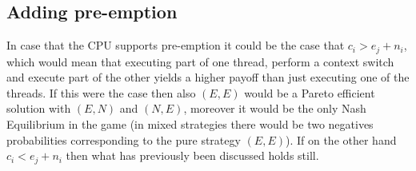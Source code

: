 \subsection{Adding pre-emption}

In case that the CPU supports pre-emption it could be the case that
$c_i > e_j + n_i$, which would mean that executing part of one thread, perform
a context switch and execute part of the other yields a higher payoff than
just executing one of the threads. If this were the case then also $(E, E)$
would be a Pareto efficient solution with $(E, N)$ and $(N, E)$, moreover it
would be the only Nash Equilibrium in the game (in mixed strategies there
would be two negatives probabilities corresponding to the pure strategy $(E,E)$).
If on the other hand $c_i < e_j + n_i$ then what has previously been discussed
holds still.




